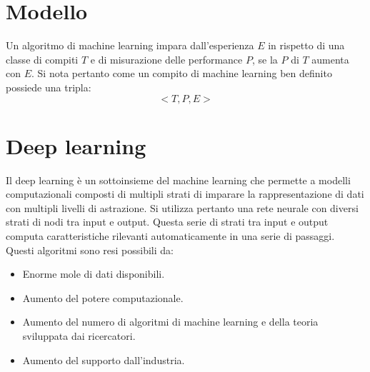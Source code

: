 \section{Modello}
Un algoritmo di machine learning impara dall'esperienza $E$ in rispetto di una classe di compiti $T$ e di misurazione delle performance $P$, se la $P$ di $T$ aumenta con $E$.
Si nota pertanto come un compito di machine learning ben definito possiede una tripla:
$$<T, P, E>$$

\section{Deep learning}
Il deep learning \`e un sottoinsieme del machine learning che permette a modelli computazionali composti di multipli strati di imparare la rappresentazione di dati con multipli livelli di astrazione.
Si utilizza pertanto una rete neurale con diversi strati di nodi tra input e output.
Questa serie di strati tra input e output computa caratteristiche rilevanti automaticamente in una serie di passaggi.
Questi algoritmi sono resi possibili da:
\begin{multicols}{2}
	\begin{itemize}
		\item Enorme mole di dati disponibili.
		\item Aumento del potere computazionale.
		\item Aumento del numero di algoritmi di machine learning e della teoria sviluppata dai ricercatori.
		\item Aumento del supporto dall'industria.
	\end{itemize}
\end{multicols}
